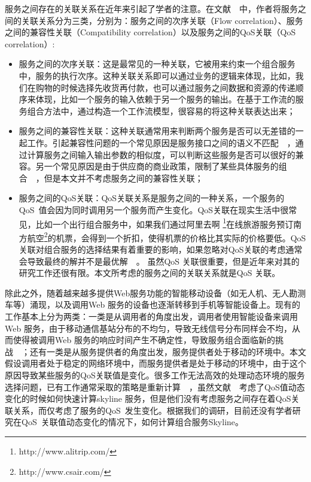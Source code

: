服务之间存在的关联关系在近年来引起了学者的注意。在文献~\cite{barakat2013efficient}~中，作者将服务之间的关联关系分为三类，分别为：服务之间的次序关联（Flow correlation）、服务之间的兼容性关联（Compatibility correlation）以及服务之间的QoS关联（QoS correlation）:

\begin{itemize}

\item 服务之间的次序关联：这是最常见的一种关联，它被用来约束一个组合服务中，服务的执行次序。这种关联关系即可以通过业务的逻辑来体现，比如，我们在购物的时候选择先收货再付款，也可以通过服务之间数据和资源的传递顺序来体现，比如一个服务的输入依赖于另一个服务的输出。在基于工作流的服务组合方法中，通过构造一个工作流模型，很容易的将这种关联表达出来；

\item 服务之间的兼容性关联：这种关联通常用来判断两个服务是否可以无差错的一起工作。引起兼容性问题的一个常见原因是服务接口之间的语义不匹配~\cite{guo2010correlation,lecue2011seeking}~，通过计算服务之间输入输出参数的相似度，可以判断这些服务是否可以很好的兼容。另一个常见原因是由于供应商的商业政策，限制了某些具体服务的组合~\cite{li2007high,wu2014correlation}~，但是本文并不考虑服务之间的兼容性关联；

\item 服务之间的QoS关联：QoS关联关系是服务之间的一种关系，一个服务的QoS~值会因为同时调用另一个服务而产生变化。QoS关联在现实生活中很常见，比如一个出行组合服务中，如果我们通过阿里去啊 \footnote{http://www.alitrip.com/}在线旅游服务预订南方航空\footnote{http://www.csair.com/}的机票，会得到一个折扣，使得机票的价格比其实际的价格要低。QoS 关联对组合服务的选择结果有着重要的影响，如果忽略对QoS关联的考虑通常会导致最终的解并不是最优解~\cite{deng2014service,ye2008service,barakat2012efficient,zhang2014correlation}~。
    虽然QoS 关联很重要，但是近年来对其的研究工作还很有限。本文所考虑的服务之间的关联关系就是QoS 关联。

\end{itemize}

除此之外，随着越来越多提供Web服务功能的智能移动设备（如无人机、无人勘测车等）涌现，以及调用Web 服务的设备也逐渐转移到手机等智能设备上。现有的工作基本上分为两类：一类是从调用者的角度出发，调用者使用智能设备来调用Web 服务，由于移动通信基站分布的不均匀，导致无线信号分布同样会不均，从而使得被调用Web 服务的响应时间产生不确定性，导致服务组合面临新的挑战~\cite{deng2014mobility}~；还有一类是从服务提供者的角度出发，服务提供者处于移动的环境中。本文假设调用者处于稳定的网络环境中，而服务提供者是处于移动的环境中，由于这个原因导致某些服务的QoS关联值是变化。很多工作无法高效的处理动态环境的服务选择问题，已有工作通常采取的策略是重新计算~\cite{alrifai2010selecting}~，虽然文献~\cite{jwu2010skyline}~考虑了QoS值动态变化的时候如何快速计算skyline 服务，但是他们没有考虑服务之间存在着QoS关联关系，而仅考虑了服务的QoS~发生变化。根据我们的调研，目前还没有学者研究在QoS~关联值动态变化的情况下，如何计算组合服务Skyline。

